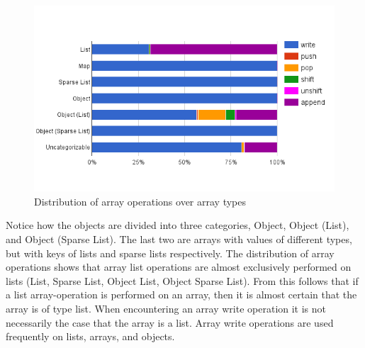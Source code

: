 \begin{figure}
\centering
\includegraphics[width=\textwidth]{chapters/study/g12.png}
\caption{Distribution of array operations over array types}
\label{fig:type_operations}
\end{figure}

Notice how the objects are divided into three categories, Object, Object (List), and Object (Sparse List). The last two are arrays with values of different types, but with keys of lists and sparse lists respectively. The distribution of array operations shows that array list operations are almost exclusively performed on lists (List, Sparse List, Object List, Object Sparse List). From this follows that if a list array-operation is performed on an array, then it is almost certain that the array is of type list. When encountering an array write operation it is not necessarily the case that the array is a list. Array write operations are used frequently on lists, arrays, and objects.







